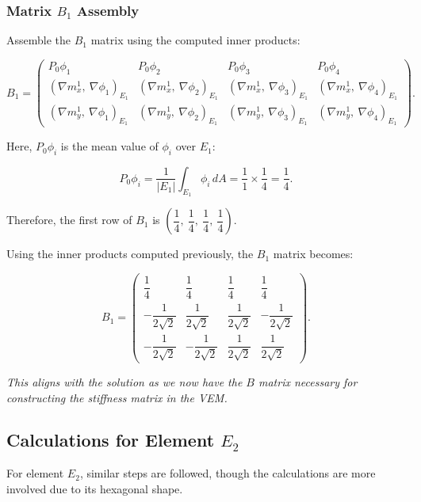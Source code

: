 \documentclass[class=article, crop=false]{standalone}
\begin{document}
\subsubsection{Matrix $B_1$ Assembly}

Assemble the $B_1$ matrix using the computed inner products:

\[
B_1 = \begin{pmatrix}
P_0 \phi_1 & P_0 \phi_2 & P_0 \phi_3 & P_0 \phi_4 \\
\left( \nabla m_x^1,\ \nabla \phi_1 \right)_{E_1} & \left( \nabla m_x^1,\ \nabla \phi_2 \right)_{E_1} & \left( \nabla m_x^1,\ \nabla \phi_3 \right)_{E_1} & \left( \nabla m_x^1,\ \nabla \phi_4 \right)_{E_1} \\
\left( \nabla m_y^1,\ \nabla \phi_1 \right)_{E_1} & \left( \nabla m_y^1,\ \nabla \phi_2 \right)_{E_1} & \left( \nabla m_y^1,\ \nabla \phi_3 \right)_{E_1} & \left( \nabla m_y^1,\ \nabla \phi_4 \right)_{E_1}
\end{pmatrix}.
\]

Here, $P_0 \phi_i$ is the mean value of $\phi_i$ over $E_1$:

\[
P_0 \phi_i = \dfrac{1}{|E_1|} \int_{E_1} \phi_i \, dA = \dfrac{1}{1} \times \dfrac{1}{4} = \dfrac{1}{4}.
\]

Therefore, the first row of $B_1$ is $\left( \dfrac{1}{4},\ \dfrac{1}{4},\ \dfrac{1}{4},\ \dfrac{1}{4} \right)$.

Using the inner products computed previously, the $B_1$ matrix becomes:

\[
B_1 = \begin{pmatrix}
\dfrac{1}{4} & \dfrac{1}{4} & \dfrac{1}{4} & \dfrac{1}{4} \\
- \dfrac{1}{2\sqrt{2}} & \dfrac{1}{2\sqrt{2}} & \dfrac{1}{2\sqrt{2}} & - \dfrac{1}{2\sqrt{2}} \\
- \dfrac{1}{2\sqrt{2}} & - \dfrac{1}{2\sqrt{2}} & \dfrac{1}{2\sqrt{2}} & \dfrac{1}{2\sqrt{2}}
\end{pmatrix}.
\]

\noindent
\textit{This aligns with the solution as we now have the $B$ matrix necessary for constructing the stiffness matrix in the VEM.}

\subsection{Calculations for Element $E_2$}

For element $E_2$, similar steps are followed, though the calculations are more involved due to its hexagonal shape.
\end{document}
